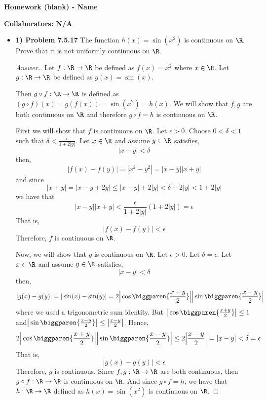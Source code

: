 \documentclass[10pt,twoside]{article}
\begin{document}
\begin{center}
\huge{\bf{Homework (blank)} - Name}
\end{center}

\medskip

\noindent \large{\textbf{Collaborators: N/A}}

\medskip

\begin{itemize}
    \item\textbf{1) Problem 7.5.17} \newline
    \noindent\makebox[\linewidth]{\rule{18cm}{0.4pt}}
The function $h(x) = \sin(x^2)$ is continuous on $\R.$
Prove that it is not uniformly continuous on $\R.$
    \begin{proof}[Answer.]
    Let $f:\R\to\R$ be defined as $f(x) = x^2$ where $x\in \R$. Let $g:\R\to\R$ be defined as $g(x) = \sin(x)$.
    
    Then $g\circ f : \R\to\R$ is defined as $(g\circ f)(x) = g(f(x)) = \sin(x^2) = h(x)$. We will show that $f,g$ are both continuous on $\R$ and therefore $g\circ f = h$ is continuous on $\R$.
    
    First we will show that $f$ is continuous on $\R$. Let $\epsilon > 0$. Choose $0<\delta<1$ such that $\delta < \frac{\epsilon}{1 + 2|y|}$. Let $x\in \R$ and assume $y\in \R$ satisfies,
    \[  |x-y|<\delta  \]
    then,
    \[|f(x) - f(y)| = |x^2 - y^2| = |x-y||x+y|\]
    and since \[|x+y| = |x-y+2y|\leq |x-y|+2|y|<\delta + 2|y|<1 + 2|y|\]
    we have that
    \[|x-y||x+y|<\frac{\epsilon}{1 + 2|y|}(1 + 2|y|) = \epsilon\]
    That is,
    \[|f(x) - f(y)| < \epsilon\]
    Therefore, $f$ is continuous on $\R$.
    
    Now, we will show that $g$ is continuous on $\R$. Let $\epsilon > 0$. Let $\delta = \epsilon$. Let $x\in\R$ and assume $y\in \R$ satisfies,
    \[|x-y|<\delta\]
    then,
    \[|g(x) - g(y)| = |\sin(x) - \sin(y)| = 2\Big|\cos\biggparen{\frac{x+y}{2}}\Big|\Big|\sin\biggparen{\frac{x-y}{2}}\Big|\]
    where we used a trigonometric sum identity. But $\big|\cos\biggparen{\frac{x+y}{2}}\big| \leq 1$ and\newline $\big|\sin\biggparen{\frac{x-y}{2}}\big|\leq \big|\frac{x-y}{2}\big|$. Hence,
    \[2\Big|\cos\biggparen{\frac{x+y}{2}}\Big|\Big|\sin\biggparen{\frac{x-y}{2}}\Big| \leq 2\Big|\frac{x-y}{2}\Big| = |x-y| < \delta = \epsilon\]
    That is, 
    \[|g(x) - g(y)| < \epsilon\]
    Therefore, $g$ is continuous.\smallskip
    Since $f,g:\R\to\R$ are both continuous, then $g\circ f:\R\to\R$ is continuous on $\R$. And since $g\circ f = h$, we have that $h:\R\to\R$ defined as $h(x) = \sin(x^2)$ is continuous on $\R$.\medskip
    

\end{proof}
\end{itemize}
\end{document}
